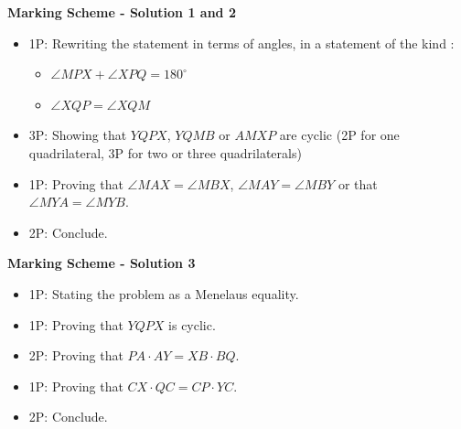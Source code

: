 {\textbf{Marking Scheme - Solution 1 and 2}

\begin{itemize}
    \item 1P: Rewriting the statement in terms of angles, in a statement of the kind : 
    \begin{itemize}
        \item $\angle MPX+\angle XPQ=180^\circ$
        \item $\angle XQP=\angle XQM$
    \end{itemize}
    \item 3P: Showing that $YQPX$, $YQMB$ or $AMXP$ are cyclic (2P for one quadrilateral, 3P for two or three quadrilaterals)
    \item 1P: Proving that $\angle MAX=\angle MBX$, $\angle MAY=\angle MBY$ or that $\angle MYA=\angle MYB$.
    \item 2P: Conclude.
\end{itemize}

\textbf{Marking Scheme - Solution 3}

\begin{itemize}
    \item 1P: Stating the problem as a Menelaus equality.
    \item 1P: Proving that $YQPX$ is cyclic.
    \item 2P: Proving that $PA\cdot AY=XB\cdot BQ$.
    \item 1P: Proving that $CX\cdot QC=CP\cdot YC$.
    \item 2P: Conclude.
\end{itemize}
}

